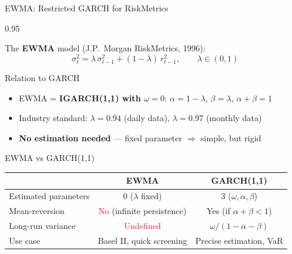 \documentclass[9pt, aspectratio=169, t]{beamer}
\begin{document}
\begin{frame}{EWMA: Restricted GARCH for RiskMetrics}
    \begin{cminipage}{0.95\textwidth}
        \vspace{-0.2cm}
        {\scriptsize
        \begin{defn}
            The \textbf{EWMA} model (J.P.\ Morgan RiskMetrics, 1996):
            \vspace{-2mm}
            \[
                \sigma_t^2 = \lambda\, \sigma_{t-1}^2 + (1 - \lambda)\, r_{t-1}^2, \qquad \lambda \in (0,1)
            \]
        \end{defn}
        \vspace{-0.15cm}
        \begin{block}{Relation to GARCH}
            \begin{itemize}\setlength{\itemsep}{0pt}
                \item EWMA = \textbf{IGARCH(1,1) with $\omega = 0$}: \quad $\alpha = 1 - \lambda$, \; $\beta = \lambda$, \; $\alpha + \beta = 1$
                \item Industry standard: $\lambda = 0.94$ (daily data), $\lambda = 0.97$ (monthly data)
                \item \textbf{No estimation needed} --- fixed parameter $\Rightarrow$ simple, but rigid
            \end{itemize}
        \end{block}
        \vspace{-0.15cm}
        \begin{alertblock}{EWMA vs GARCH(1,1)}
            \vspace{-1mm}
            \begin{center}
            \begin{tabular}{lcc}
                \toprule
                & \textbf{EWMA} & \textbf{GARCH(1,1)} \\
                \midrule
                Estimated parameters & 0 ($\lambda$ fixed) & 3 ($\omega, \alpha, \beta$) \\
                Mean-reversion & \textcolor{Crimson}{No} (infinite persistence) & \textcolor{Forest}{Yes} (if $\alpha + \beta < 1$) \\
                Long-run variance & \textcolor{Crimson}{Undefined} & \textcolor{Forest}{$\omega / (1 - \alpha - \beta)$} \\
                Use case & Basel II, quick screening & Precise estimation, VaR \\
                \bottomrule
            \end{tabular}
            \end{center}
        \end{alertblock}
        }
    \end{cminipage}
\end{frame}
\end{document}

